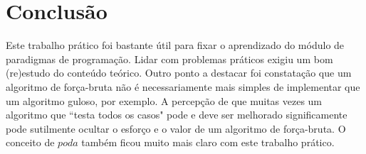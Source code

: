 \documentclass[a4paper,12pt,titlepage]{article}
\begin{document}
\begin{comment}
\section{Dificuldades Encontradas}

Algumas das principais dificuldades encontras neste trabalho prático foram: 
\begin{itemize}[leftmargin=1.6cm]
    \item Discernimento entre os três paradigmas ao analisar ideias para os algoritmos. Não foi raro descobrir que ideias para um algoritmo de determinado paradigma eram na realidade de outro paradigma. Por exemplo, percorrer trechos de uma mensagem e testar todas as possibilidades é uma estratégia que pode ser vista como gulosa em um primeiro momento, apesar de ser na realidade de força bruta.
    \item Algoritmo de programação dinâmica: o resultado apresentando neste trabalho foi construído após muitas discussões e colaboração de colegas do departamento de computação. Muitas tentativas anteriores não tiveram sucesso ou foram descartadas ao decorrer do trabalho;
    \item Hipótese incorreta das possibilidades de $true$. A princípio, acreditávamos que apenas `00-1111' e '1111-00' eram as mensagens que, apesar de conter incertezas, tinham como resposta correta $true$. Porém, mais tarde descobrimos outros casos, como por exemplo: `00-111-00' e `00-111-0-1111'. Essa foi uma das descobertas que desmotivou a busca de um algoritmo ótimo no caso do guloso.
    \ \\
\end{itemize}
\end{comment}

\section{Conclusão}
Este trabalho prático foi bastante útil para fixar o aprendizado do módulo de paradigmas de programação. Lidar com problemas práticos exigiu um bom (re)estudo do conteúdo teórico. Outro ponto a destacar foi constatação que um algoritmo de força-bruta não é necessariamente mais simples de implementar que um algoritmo guloso, por exemplo. A percepção de que muitas vezes um algoritmo que ``testa todos os casos" pode e deve ser melhorado significamente pode sutilmente ocultar o esforço e o valor de um algoritmo de força-bruta. O conceito de $poda$ também ficou muito mais claro com este trabalho prático.
\end{document}
